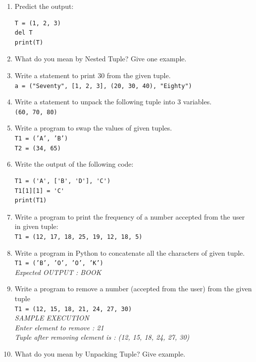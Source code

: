 \documentclass[11pt,a4paper]{article}
\begin{document}
\begin{enumerate}[label=\textbf{Q\arabic*.}]
\item Predict the output:
\begin{lstlisting}
T = (1, 2, 3)
del T
print(T)
\end{lstlisting}

\item What do you mean by Nested Tuple? Give one example.

\item Write a statement to print 30 from the given tuple.\\
\texttt{a = ("Seventy", [1, 2, 3], (20, 30, 40), "Eighty")}

\item Write a statement to unpack the following tuple into 3 variables.\\
\texttt{(60, 70, 80)}

\item Write a program to swap the values of given tuples.\\
\texttt{T1 = ('A', 'B')}\\
\texttt{T2 = (34, 65)}

\item Write the output of the following code:
\begin{lstlisting}
T1 = ('A', ['B', 'D'], 'C')
T1[1][1] = 'C'
print(T1)
\end{lstlisting}

\item Write a program to print the frequency of a number accepted from the user in given tuple:\\
\texttt{T1 = (12, 17, 18, 25, 19, 12, 18, 5)}

\item Write a program in Python to concatenate all the characters of given tuple.\\
\texttt{T1 = ('B', 'O', 'O', 'K')}\\
\textit{Expected OUTPUT : BOOK}

\item Write a program to remove a number (accepted from the user) from the given tuple\\
\texttt{T1 = (12, 15, 18, 21, 24, 27, 30)}\\
\textit{SAMPLE EXECUTION}\\
\textit{Enter element to remove : 21}\\
\textit{Tuple after removing element is : (12, 15, 18, 24, 27, 30)}

\item What do you mean by Unpacking Tuple? Give example.


\end{enumerate}
\end{document}
